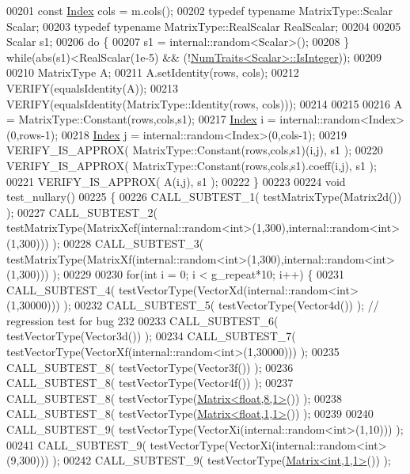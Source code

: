 \begin{DoxyCode}
00201   \textcolor{keyword}{const} \hyperlink{namespace_eigen_a62e77e0933482dafde8fe197d9a2cfde}{Index} cols = m.cols();
00202   \textcolor{keyword}{typedef} \textcolor{keyword}{typename} MatrixType::Scalar Scalar;
00203   \textcolor{keyword}{typedef} \textcolor{keyword}{typename} MatrixType::RealScalar RealScalar;
00204 
00205   Scalar s1;
00206   \textcolor{keywordflow}{do} \{
00207     s1 = internal::random<Scalar>();
00208   \} \textcolor{keywordflow}{while}(abs(s1)<RealScalar(1e-5) && (!\hyperlink{group___core___module_struct_eigen_1_1_num_traits}{NumTraits<Scalar>::IsInteger}));
00209 
00210   MatrixType A;
00211   A.setIdentity(rows, cols);
00212   VERIFY(equalsIdentity(A));
00213   VERIFY(equalsIdentity(MatrixType::Identity(rows, cols)));
00214 
00215 
00216   A = MatrixType::Constant(rows,cols,s1);
00217   \hyperlink{namespace_eigen_a62e77e0933482dafde8fe197d9a2cfde}{Index} i = internal::random<Index>(0,rows-1);
00218   \hyperlink{namespace_eigen_a62e77e0933482dafde8fe197d9a2cfde}{Index} j = internal::random<Index>(0,cols-1);
00219   VERIFY\_IS\_APPROX( MatrixType::Constant(rows,cols,s1)(i,j), s1 );
00220   VERIFY\_IS\_APPROX( MatrixType::Constant(rows,cols,s1).coeff(i,j), s1 );
00221   VERIFY\_IS\_APPROX( A(i,j), s1 );
00222 \}
00223 
00224 \textcolor{keywordtype}{void} test\_nullary()
00225 \{
00226   CALL\_SUBTEST\_1( testMatrixType(Matrix2d()) );
00227   CALL\_SUBTEST\_2( testMatrixType(MatrixXcf(internal::random<int>(1,300),internal::random<int>(1,300))) );
00228   CALL\_SUBTEST\_3( testMatrixType(MatrixXf(internal::random<int>(1,300),internal::random<int>(1,300))) );
00229   
00230   \textcolor{keywordflow}{for}(\textcolor{keywordtype}{int} i = 0; i < g\_repeat*10; i++) \{
00231     CALL\_SUBTEST\_4( testVectorType(VectorXd(internal::random<int>(1,30000))) );
00232     CALL\_SUBTEST\_5( testVectorType(Vector4d()) );  \textcolor{comment}{// regression test for bug 232}
00233     CALL\_SUBTEST\_6( testVectorType(Vector3d()) );
00234     CALL\_SUBTEST\_7( testVectorType(VectorXf(internal::random<int>(1,30000))) );
00235     CALL\_SUBTEST\_8( testVectorType(Vector3f()) );
00236     CALL\_SUBTEST\_8( testVectorType(Vector4f()) );
00237     CALL\_SUBTEST\_8( testVectorType(\hyperlink{group___core___module}{Matrix<float,8,1>}()) );
00238     CALL\_SUBTEST\_8( testVectorType(\hyperlink{group___core___module_class_eigen_1_1_matrix}{Matrix<float,1,1>}()) );
00239 
00240     CALL\_SUBTEST\_9( testVectorType(VectorXi(internal::random<int>(1,10))) );
00241     CALL\_SUBTEST\_9( testVectorType(VectorXi(internal::random<int>(9,300))) );
00242     CALL\_SUBTEST\_9( testVectorType(\hyperlink{group___core___module_class_eigen_1_1_matrix}{Matrix<int,1,1>}()) );

\end{DoxyCode}
